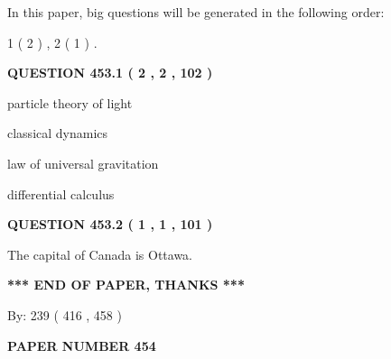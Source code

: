 \documentclass[12pt]{article}
\begin{document}
In this paper, big questions will be generated in the following order: 
   
   
   1 ( 2 )
 ,
   2 ( 1 )
 .
  
\vspace{0.2in}
  
{\textbf{\Large{QUESTION
453.1 
 ( 2 , 2 , 102 )
}}}
  
  
 
 
\noindent{}
 
 
particle theory of light
 
 
classical dynamics
 
 
law of universal gravitation
 
 
differential calculus
 
 
 
 
  
\vspace{0.2in}
  
{\textbf{\Large{QUESTION
453.2 
 ( 1 , 1 , 101 )
}}}
  
  
 
 
\noindent{}
 
 
The capital of Canada is Ottawa.
 
 
 
 
   
   
\vspace{1.0in} 
{\textbf{\large{ *** END OF PAPER, THANKS *** }}} 
   
   
\hspace{1.0in} By: 
 239 ( 416 ,  458 )
   
   
   
   
\newpage 
\setcounter{page}{ 
   454001 } 
   
   
   
   
 {\textbf{ \Large{ PAPER NUMBER  454  }}}
   
   
\vspace{0.2in}
   
   
   
   
   
\vspace{0.2in}
   
\end{document}
